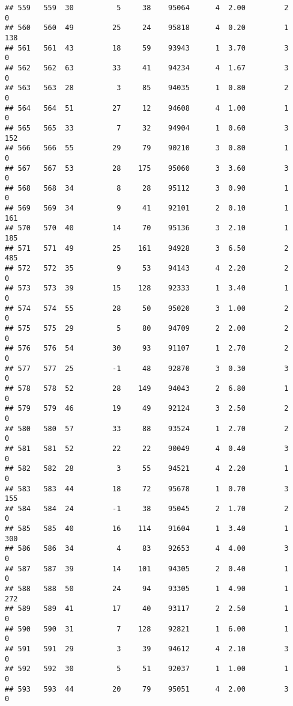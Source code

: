 \documentclass[
]{article}
\begin{document}
\begin{verbatim}
## 559   559  30          5     38    95064      4  2.00         2        0
## 560   560  49         25     24    95818      4  0.20         1      138
## 561   561  43         18     59    93943      1  3.70         3        0
## 562   562  63         33     41    94234      4  1.67         3        0
## 563   563  28          3     85    94035      1  0.80         2        0
## 564   564  51         27     12    94608      4  1.00         1        0
## 565   565  33          7     32    94904      1  0.60         3      152
## 566   566  55         29     79    90210      3  0.80         1        0
## 567   567  53         28    175    95060      3  3.60         3        0
## 568   568  34          8     28    95112      3  0.90         1        0
## 569   569  34          9     41    92101      2  0.10         1      161
## 570   570  40         14     70    95136      3  2.10         1      185
## 571   571  49         25    161    94928      3  6.50         2      485
## 572   572  35          9     53    94143      4  2.20         2        0
## 573   573  39         15    128    92333      1  3.40         1        0
## 574   574  55         28     50    95020      3  1.00         2        0
## 575   575  29          5     80    94709      2  2.00         2        0
## 576   576  54         30     93    91107      1  2.70         2        0
## 577   577  25         -1     48    92870      3  0.30         3        0
## 578   578  52         28    149    94043      2  6.80         1        0
## 579   579  46         19     49    92124      3  2.50         2        0
## 580   580  57         33     88    93524      1  2.70         2        0
## 581   581  52         22     22    90049      4  0.40         3        0
## 582   582  28          3     55    94521      4  2.20         1        0
## 583   583  44         18     72    95678      1  0.70         3      155
## 584   584  24         -1     38    95045      2  1.70         2        0
## 585   585  40         16    114    91604      1  3.40         1      300
## 586   586  34          4     83    92653      4  4.00         3        0
## 587   587  39         14    101    94305      2  0.40         1        0
## 588   588  50         24     94    93305      1  4.90         1      272
## 589   589  41         17     40    93117      2  2.50         1        0
## 590   590  31          7    128    92821      1  6.00         1        0
## 591   591  29          3     39    94612      4  2.10         3        0
## 592   592  30          5     51    92037      1  1.00         1        0
## 593   593  44         20     79    95051      4  2.00         3        0

\end{verbatim}
\end{document}
